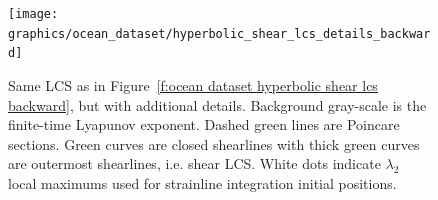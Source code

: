 \documentclass{article}
\begin{document}
\begin{figure}
\begin{center}
\texttt{[image: graphics/ocean\_dataset/hyperbolic\_shear\_lcs\_details\_backward]}
\end{center}
\caption{Same LCS as in Figure~\ref{f:ocean dataset hyperbolic shear lcs backward}, but with additional details. Background gray-scale is the finite-time Lyapunov exponent. Dashed green lines are Poincare sections. Green curves are closed shearlines with thick green curves are outermost shearlines, i.e. shear LCS. White dots indicate $\lambda_2$ local maximums used for strainline integration initial positions.}
\label{f:ocean dataset hyperbolic shear lcs details backward}
\end{figure}





\end{document}
